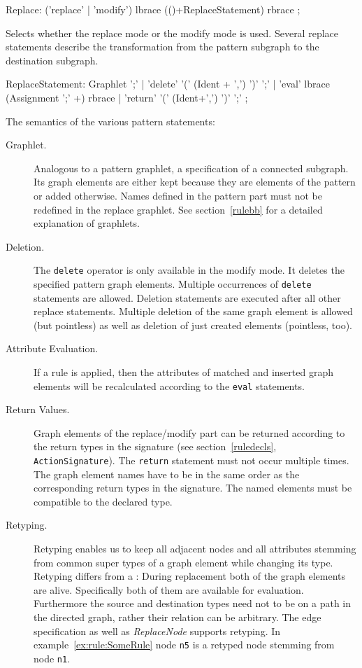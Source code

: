 \begin{rail}
  Replace: ('replace' | 'modify') lbrace (()+ReplaceStatement) rbrace ;
\end{rail}
Selects whether the replace mode or the modify mode is used. Several replace statements describe the transformation from the pattern subgraph to the destination subgraph.

\begin{rail}  
  ReplaceStatement: Graphlet ';' |
    'delete' '(' (Ident + ',') ')' ';' |
    'eval' lbrace (Assignment ';' +) rbrace |
    'return' '(' (Ident+',') ')' ';' ;
\end{rail}
The semantics of the various pattern statements:
\begin{description}
  \item[Graphlet.] Analogous to a pattern graphlet, a specification of a connected subgraph. Its graph elements are either kept because they are elements of the pattern or added otherwise. Names defined in the pattern part must not be redefined in the replace graphlet. See section~\ref{rulebb} for a detailed explanation of graphlets. 
  \item[Deletion.] The \texttt{delete} operator is only available in the modify mode. It deletes the specified pattern graph elements. Multiple occurrences of \texttt{delete} statements are allowed. Deletion statements are executed after all other replace statements. Multiple deletion of the same graph element is allowed (but pointless) as well as deletion of just created elements (pointless, too).
  \item[Attribute Evaluation.] If a rule is applied, then the attributes of matched and inserted graph elements will be recalculated according to the \texttt{eval} statements.
  \item[Return Values.] Graph elements of the replace/modify part can be returned according to the return types in the signature (see section~\ref{ruledecls}, \texttt{ActionSignature}). The \texttt{return} statement must not occur multiple times. The graph element names have to be in the same order as the corresponding return types in the signature. The named elements must be compatible to the declared type.
  \item[Retyping.] Retyping enables us to keep all adjacent nodes and all attributes stemming from common super types of a graph element while changing its type. 
  Retyping differs from a : During replacement both of the graph elements are alive.
  Specifically both of them are available for evaluation. 
  Furthermore the source and destination types need not to be on a path in the directed  graph, rather their relation can be arbitrary.
  The edge specification as well as \emph{ReplaceNode} supports retyping. 
  In example~\ref{ex:rule:SomeRule} node \texttt{n5} is a retyped node stemming from node \texttt{n1}.
\end{description} 

